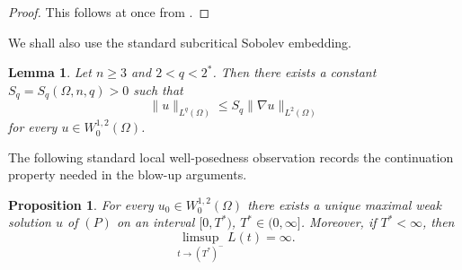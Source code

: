 \documentclass[12pt,reqno]{amsart}
\newtheorem{lemma}[theorem]{Lemma}
\newtheorem{proposition}[theorem]{Proposition}
\theoremstyle{definition}
\theoremstyle{remark}
\numberwithin{equation}{section}
\begin{document}
\begin{proof}
	This follows at once from \cite[Theorem 4.2.2]{BEL}.
\end{proof}


We shall also use the standard subcritical Sobolev embedding.

\begin{lemma}\label{lem:sobolev}
	Let $n \ge 3$ and $2<q<2^*$.
	Then there exists a constant $S_q=S_q(\Omega,n,q)>0$ such that
	\[
	\|u\|_{L^q(\Omega)} \le S_q\|\nabla u\|_{L^2(\Omega)}
	\]
	for every $u\in W^{1,2}_0(\Omega)$.
\end{lemma}

The following standard local well-posedness observation records the continuation property needed in the blow-up arguments.

\begin{proposition}\label{prop:local}
For every $u_0\in W^{1,2}_0(\Omega)$ there exists a unique maximal weak solution $u$ of $(P)$ on an interval $[0,T^*)$, $T^*\in(0,\infty]$. Moreover, if $T^*<\infty$, then
\[
\limsup_{t\to(T^*)^-}L(t)=\infty.
\]
\end{proposition}
\end{document}
